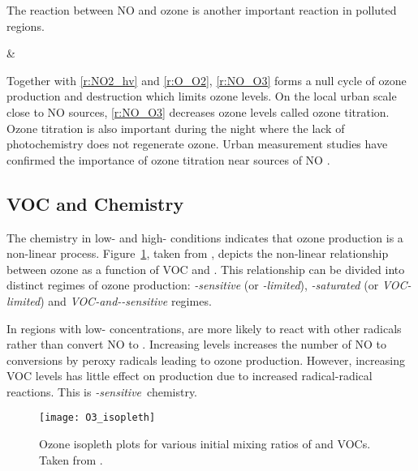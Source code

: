The reaction between NO and ozone is another important reaction in polluted regions.
\begin{rxnarray}
     & \rightarrow {} \label{r:NO_O3}
\end{rxnarray}
Together with \eqref{r:NO2_hv} and \eqref{r:O_O2}, \eqref{r:NO_O3} forms a null cycle of ozone production and destruction which limits ozone levels.
On the local urban scale close to NO sources, \eqref{r:NO_O3} decreases ozone levels called ozone titration.
Ozone titration is also important during the night where the lack of photochemistry does not regenerate ozone.
Urban measurement studies have confirmed the importance of ozone titration near sources of NO \citep{Syri:2001}.

\subsection[VOC and NOx Chemistry]{VOC and  Chemistry} \label{ss:VOC_NOx}
The chemistry in low- and high- conditions indicates that ozone production is a non-linear process.
Figure~\ref{f:O3_isopleth}, taken from \citet{Jenkin:2000}, depicts the non-linear relationship between ozone as a function of VOC and .
This relationship can be divided into distinct regimes of ozone production: \emph{-sensitive} (or \emph{-limited}), \emph{-saturated} (or \emph{VOC-limited}) and \emph{VOC-and--sensitive} regimes. 

In regions with low- concentrations,  are more likely to react with other radicals rather than convert NO to .
Increasing  levels increases the number of NO to  conversions by peroxy radicals leading to ozone production.
However, increasing VOC levels has little effect on  production due to increased radical-radical reactions.
This is \emph{-sensitive}~chemistry.

\setlength{\textfloatsep}{1mm}
\begin{figure}[ht]%
	\begin{center}%
        \caption[Ozone mixing ratios as a function of  and VOCs]{Ozone isopleth plots for various initial mixing ratios of  and VOCs. Taken from \citet{Jenkin:2000}.}%
        \texttt{[image: O3\_isopleth]}%
		\label{f:O3_isopleth}%
	\end{center}%
\end{figure}%

